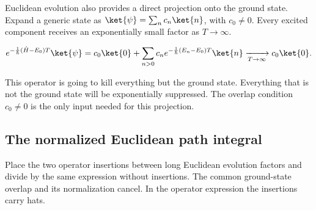 Euclidean evolution also provides a direct projection onto the ground state.
Expand a generic state as $\ket{\psi}=\sum_n c_n\ket{n}$, with $c_0\neq0$.
Every excited component receives an exponentially small factor as
$T\to\infty$.

\begin{equation}
  e^{-\frac{1}{\hbar}(\hat H-E_0)T}\ket{\psi}
  =c_0\ket{0}+
  \sum_{n>0}c_n
  e^{-\frac{1}{\hbar}(E_n-E_0)T}\ket{n}
  \xrightarrow[T\to\infty]{}c_0\ket{0}.
  \label{eq:proposal-ground-state-projection}
\end{equation}

This operator is going to kill everything but the ground state.  Everything
that is not the ground state will be exponentially suppressed.  The overlap
condition $c_0\neq0$ is the only input needed for this projection.

\subsection{The normalized Euclidean path integral}

Place the two operator insertions between long Euclidean evolution factors and
divide by the same expression without insertions.  The common ground-state
overlap and its normalization cancel.  In the operator expression the
insertions carry hats.

